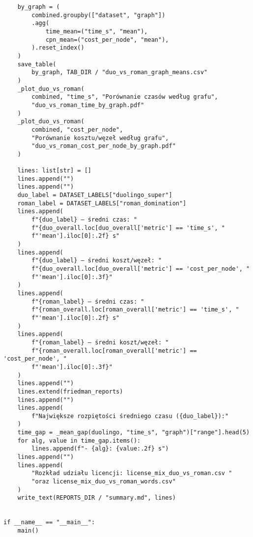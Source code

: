 \begin{verbatim}
    by_graph = (
        combined.groupby(["dataset", "graph"])
        .agg(
            time_mean=("time_s", "mean"),
            cpn_mean=("cost_per_node", "mean"),
        ).reset_index()
    )
    save_table(
        by_graph, TAB_DIR / "duo_vs_roman_graph_means.csv"
    )
    _plot_duo_vs_roman(
        combined, "time_s", "Porównanie czasów według grafu",
        "duo_vs_roman_time_by_graph.pdf"
    )
    _plot_duo_vs_roman(
        combined, "cost_per_node",
        "Porównanie kosztu/węzeł według grafu",
        "duo_vs_roman_cost_per_node_by_graph.pdf"
    )

    lines: list[str] = []
    lines.append("")
    lines.append("")
    duo_label = DATASET_LABELS["duolingo_super"]
    roman_label = DATASET_LABELS["roman_domination"]
    lines.append(
        f"{duo_label} – średni czas: "
        f"{duo_overall.loc[duo_overall['metric'] == 'time_s', "
        f"'mean'].iloc[0]:.2f} s"
    )
    lines.append(
        f"{duo_label} – średni koszt/węzeł: "
        f"{duo_overall.loc[duo_overall['metric'] == 'cost_per_node', "
        f"'mean'].iloc[0]:.3f}"
    )
    lines.append(
        f"{roman_label} – średni czas: "
        f"{roman_overall.loc[roman_overall['metric'] == 'time_s', "
        f"'mean'].iloc[0]:.2f} s"
    )
    lines.append(
        f"{roman_label} – średni koszt/węzeł: "
        f"{roman_overall.loc[roman_overall['metric'] == 'cost_per_node', "
        f"'mean'].iloc[0]:.3f}"
    )
    lines.append("")
    lines.extend(friedman_reports)
    lines.append("")
    lines.append(
        f"Największe rozpiętości średniego czasu ({duo_label}):"
    )
    time_gap = _mean_gap(duolingo, "time_s", "graph")["range"].head(5)
    for alg, value in time_gap.items():
        lines.append(f"- {alg}: {value:.2f} s")
    lines.append("")
    lines.append(
        "Rozkład udziału licencji: license_mix_duo_vs_roman.csv "
        "oraz license_mix_duo_vs_roman_words.csv"
    )
    write_text(REPORTS_DIR / "summary.md", lines)


if __name__ == "__main__":
    main()
\end{verbatim}
